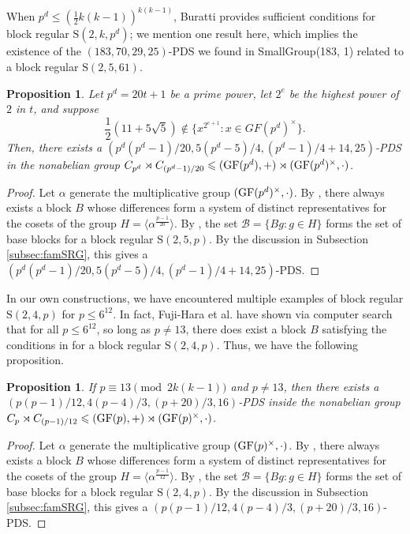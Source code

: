 \documentclass[12pt]{amsproc} %
\newtheorem{prop}[thm]{Proposition}
\theoremstyle{definition}\newtheorem{defn}[thm]{Definition}
\theoremstyle{definition}\newtheorem{rem}[thm]{Remark}
\theoremstyle{definition}\newtheorem{ex}[thm]{Example}
\newcommand{\GF}{{\rm GF}}
\renewcommand\le{\leqslant}
\renewcommand{\S}{{\mathrm S}}
\begin{document}
When $p^d \le (\frac12k(k-1))^{k(k-1)}$, Buratti \cite{buratti} provides sufficient conditions for block regular $\S(2, k, p^d)$; we mention one result here, which implies the existence of the $(183, 70, 29, 25)$-PDS we found in SmallGroup(183, 1) related to a block regular $\S(2, 5, 61)$.

\begin{prop}
\label{prop:buratti}
Let $p^d = 20t + 1$ be a prime power, let $2^e$ be the highest power of $2$ in $t$, and suppose
\[ \frac{1}{2}(11 + 5 \sqrt{5}) \notin \{x^{2^{e+1}}: x \in GF(p^d)^\times \}.\] Then, there exists a $(p^d(p^d-1)/20, 5(p^d - 5)/4, (p^d-1)/4 + 14, 25)$-PDS in the nonabelian group $C_{p^d} \rtimes C_{(p^d-1)/20} \le (\GF(p^d), +) \rtimes (\GF(p^d)^\times, \cdot)$.
\end{prop}

\begin{proof}
Let $\alpha$ generate the multiplicative group $(\GF(p^d)^\times, \cdot)$. By \cite[Theorem 7]{buratti}, there always exists a block $B$ whose differences form a system of distinct representatives for the cosets of the group $H = \langle \alpha^{\frac{p-1}{20}} \rangle$. By \cite[Theorem 2]{wilson}, the set $\mathscr{B} = \{ Bg : g \in H\}$ forms the set of base blocks for a block regular $\S(2, 5, p)$. By the discussion in Subsection \ref{subsec:famSRG}, this gives a $(p^d(p^d-1)/20, 5(p^d - 5)/4, (p^d-1)/4 + 14, 25)$-PDS.
\end{proof}

In our own constructions, we have encountered multiple examples of block regular $\S(2, 4, p)$ for $p \le 6^{12}$. In fact, Fuji-Hara et al. \cite{fuji-miao-shinohara} have shown via computer search that for all $p \le 6^{12}$, so long as $p \neq 13$, there does exist a block $B$ satisfying the conditions in \cite[Theorem 2]{wilson} for a block regular $\S(2, 4, p)$. Thus, we have the following proposition.

\begin{prop}\label{Fuji-PDS-family}
If $p \equiv 13 \pmod{2k(k-1)}$ and $p \neq 13$, then there exists a $(p(p - 1)/12, 4(p-4)/3, (p + 20)/3, 16)$-PDS inside the nonabelian group $C_{p} \rtimes C_{(p-1)/12} \le (\GF(p), +) \rtimes (\GF(p)^\times, \cdot)$.
\end{prop}
	\begin{proof}
	Let $\alpha$ generate the multiplicative group $(\GF(p)^\times, \cdot)$. By \cite[Theorem 3.9]{fuji-miao-shinohara}, there always exists a block $B$ whose differences form a system of distinct representatives for the cosets of the group $H = \langle \alpha^{\frac{p-1}{12}} \rangle$. By \cite[Theorem 2]{wilson}, the set $\mathscr{B} = \{ Bg : g \in H\}$ forms the set of base blocks for a block regular $\S(2, 4, p)$. By the discussion in Subsection \ref{subsec:famSRG}, this gives a $(p(p - 1)/12, 4(p-4)/3, (p + 20)/3, 16)$-PDS.
	\end{proof}
\end{document}
